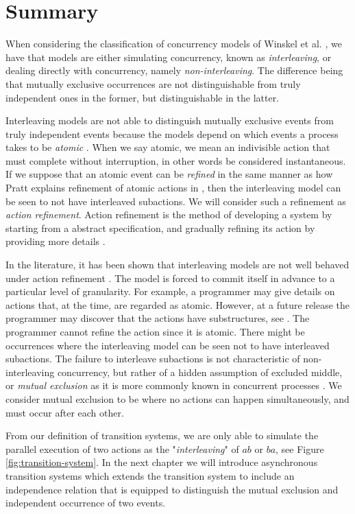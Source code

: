 \section{Summary}
    \label{sec:traditional-concurrency-summary}

    When considering the classification of concurrency models of Winskel et al. \cite{winskel94RelationshipsConcurrency}, we have that models are either simulating concurrency, known as \emph{interleaving}, or dealing directly with concurrency, namely \emph{non-interleaving}. The difference being that mutually exclusive occurrences are not distinguishable from truly independent ones in the former, but distinguishable in the latter.
    
    Interleaving models are not able to distinguish mutually exclusive events from truly independent events because the models depend on which events a process takes to be \emph{atomic} \cite[page 4]{Pratt86pomsets}. When we say atomic, we mean an indivisible action that must complete without interruption, in other words be considered instantaneous. If we suppose that an atomic event can be \emph{refined} in the same manner as how Pratt explains refinement of atomic actions in \cite{pratt91hda}, then the interleaving model can be seen to not have interleaved subactions. We will consider such a refinement as \emph{action refinement}. Action refinement is the method of developing a system by starting from a abstract specification, and gradually refining its action by providing more details \cite{Johansen16DecEventBasedConcurrencyRefinement, GlabbeekG89refinement}.
    
    In the literature, it has been shown that interleaving models are not well behaved under action refinement \cite{GlabbeekG89refinement, GlabbeekG01refinement}. The model is forced to commit itself in advance to a particular level of granularity. For example, a programmer may give details on actions that, at the time, are regarded as atomic. However, at a future release the programmer may discover that the actions have substructures, see \cite[Example 1.1]{GlabbeekG89refinement}. The programmer cannot refine the action since it is atomic. There might be occurrences where the interleaving model can be seen not to have interleaved subactions. The failure  to interleave subactions is not characteristic of non-interleaving concurrency, but rather of a hidden assumption of excluded middle, or \emph{mutual exclusion} as it is more commonly known in concurrent processes \cite{Pratt00Sculptures}. We consider mutual exclusion to be where no actions can happen simultaneously, and must occur after each other.
    
    From our definition of transition systems, we are only able to simulate the parallel execution of two actions as the "\emph{interleaving}" of $ab$ or $ba$, see Figure \ref{fig:transition-system}. In the next chapter we will introduce asynchronous transition systems which extends the transition system to include an independence relation that is equipped to distinguish the mutual exclusion and independent occurrence of two events.